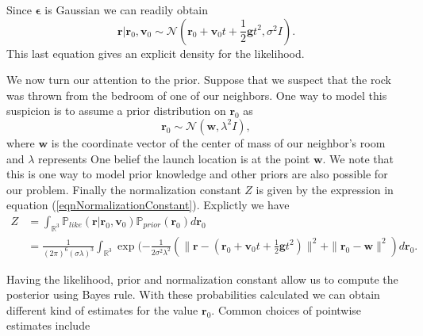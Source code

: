 \documentclass[12pt]{book}
\newcommand{\post}{\mathbb{P}_{post}}
\newcommand{\like}{\mathbb{P}_{like}}
\newcommand{\prior}{\mathbb{P}_{prior}}
\newcommand{\p}{\mathbb{P}}
\begin{document}
Since $\mathbf{\epsilon}$ is Gaussian we can readily obtain \cite{Somersalo}
\begin{equation*}
\textbf{r}|\textbf{r}_{0},\textbf{v}_{0}\sim \mathscr{N}(\textbf{r}_{0}+\textbf{v}_{0}t+\frac{1}{2}\textbf{g}t^{2}
,\sigma^{2} I).
\end{equation*}
This last equation gives an explicit density for the likelihood. 

We now turn our attention to  the prior.
Suppose that we suspect that the rock was thrown from the bedroom of one of our neighbors.
 One way to model this suspicion is to assume a prior distribution on $\textbf{r}_{0}$ as
\begin{equation*}
\textbf{r}_{0}\sim\mathscr{N}(\textbf{w},\lambda^{2} I),
\end{equation*}
where $\textbf{w}$ is the coordinate vector of the center of mass of our neighbor's room and $\lambda$ represents 
One belief the launch location is at the point $\textbf{w}$. We note that  this is one way to model 
 prior knowledge and other priors are also possible for our problem. Finally the normalization constant $Z$
is given by the expression in equation (\ref{eqnNormalizationConstant}). Explictly we have
\begin{align*}
Z&=\int_{\mathbb{R}^{3}}\like(\textbf{r}|\textbf{r}_{0},\textbf{v}_{0})
\prior(\textbf{r}_{0})d\textbf{r}_{0}\\
&= \frac{1}{(2\pi)^{6}(\sigma\lambda)^{3}}\int_{\mathbb{R}^{3}}
\exp(-\frac{1}{2\sigma^{2}\lambda^{2}}
\left(\|\textbf{r}-(\textbf{r}_{0}+\textbf{v}_{0}t+\frac{1}{2}\textbf{g}t^{2})\|^{2}
+\|\textbf{r}_{0}-\textbf{w}\|^{2}\right)d\textbf{r}_{0}.
\end{align*}


Having the likelihood, prior and normalization constant allow us to compute the posterior using
Bayes rule. With these probabilities calculated 
we can obtain different kind of estimates for the value $\textbf{r}_{0}$.  
Common choices of pointwise estimates include
\end{document}

